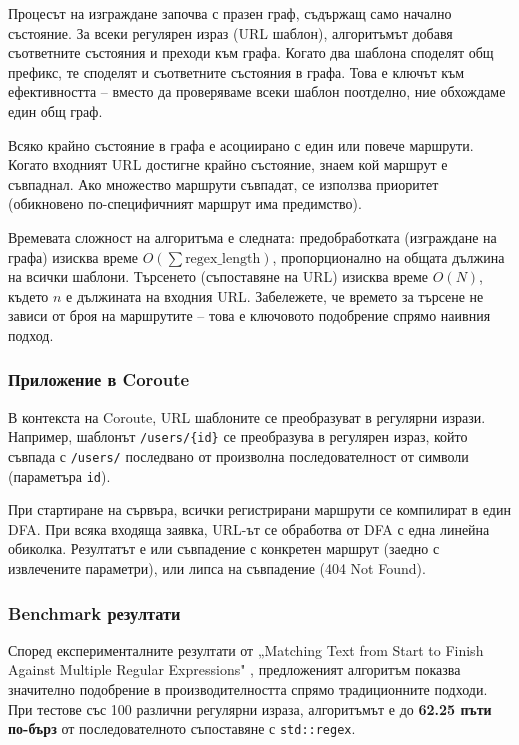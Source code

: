 Процесът на изграждане започва с празен граф, съдържащ само начално състояние. За всеки регулярен израз (URL шаблон), алгоритъмът добавя съответните състояния и преходи към графа. Когато два шаблона споделят общ префикс, те споделят и съответните състояния в графа. Това е ключът към ефективността -- вместо да проверяваме всеки шаблон поотделно, ние обхождаме един общ граф.

Всяко крайно състояние в графа е асоциирано с един или повече маршрути. Когато входният URL достигне крайно състояние, знаем кой маршрут е съвпаднал. Ако множество маршрути съвпадат, се използва приоритет (обикновено по-специфичният маршрут има предимство).

Времевата сложност на алгоритъма е следната: предобработката (изграждане на графа) изисква време $O(\sum \text{regex\_length})$, пропорционално на общата дължина на всички шаблони. Търсенето (съпоставяне на URL) изисква време $O(N)$, където $n$ е дължината на входния URL. Забележете, че времето за търсене не зависи от броя на маршрутите -- това е ключовото подобрение спрямо наивния подход.

\subsubsection{Приложение в Coroute}

В контекста на Coroute, URL шаблоните се преобразуват в регулярни изрази. Например, шаблонът \texttt{/users/\{id\}} се преобразува в регулярен израз, който съвпада с \texttt{/users/} последвано от произволна последователност от символи (параметъра \texttt{id}).

При стартиране на сървъра, всички регистрирани маршрути се компилират в един DFA. При всяка входяща заявка, URL-ът се обработва от DFA с една линейна обиколка. Резултатът е или съвпадение с конкретен маршрут (заедно с извлечените параметри), или липса на съвпадение (404 Not Found).

\subsubsection{Benchmark резултати}

Според експерименталните резултати от „Matching Text from Start to Finish Against Multiple Regular Expressions" \cite{stankov2024regex}, предложеният алгоритъм показва значително подобрение в производителността спрямо традиционните подходи. При тестове със 100 различни регулярни израза, алгоритъмът е до \textbf{62.25 пъти по-бърз} от последователното съпоставяне с \texttt{std::regex}.

